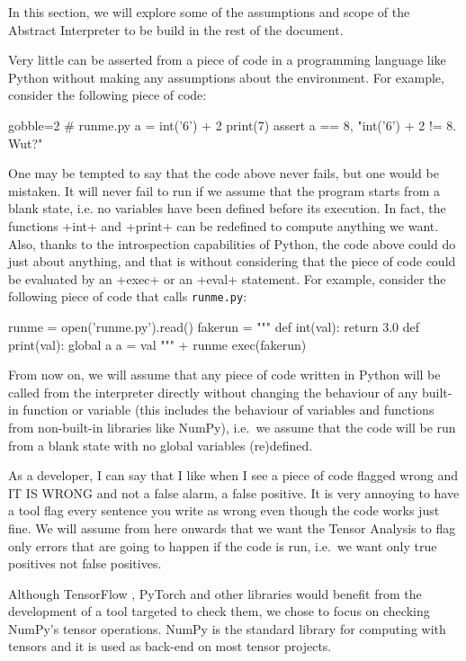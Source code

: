 In this section, we will explore some of the assumptions and scope of the Abstract
Interpreter to be build in the rest of the document.

Very little can be asserted from a piece of code in a programming language like Python
without making any assumptions about the environment. For example, consider the following
piece of code:

\begin{pythoncode*}{gobble=2}
  # runme.py
  a = int('6') + 2
  print(7)
  assert a == 8, "int('6') + 2 != 8. Wut?"
\end{pythoncode*}

One may be tempted to say that the code above never fails, but one would be mistaken.  It
will never fail to run if we assume that the program starts from a blank state, i.e. no
variables have been defined before its execution. In fact, the functions \pycode+int+ and
\pycode+print+ can be redefined to compute anything we want. Also, thanks to the
introspection capabilities of Python, the code above could do just about anything, and
that is without considering that the piece of code could be evaluated by an \pycode+exec+
or an \pycode+eval+ statement. For example, consider the following piece of code that
calls \texttt{runme.py}:

\begin{pythoncode}
  runme = open('runme.py').read()
  fakerun = """
  def int(val):
    return 3.0
  def print(val):
    global a
    a = val
  """ + runme
  exec(fakerun)
\end{pythoncode}

From now on, we will assume that any piece of code written in Python will be called from
the interpreter directly without changing the behaviour of any built-in function or
variable (this includes the behaviour of variables and functions from non-built-in
libraries like NumPy), i.e.~we assume that the code will be run from a blank state with no
global variables (re)defined.

As a developer, I can say that I like when I see a piece of code flagged wrong and IT IS
WRONG and not a false alarm, a false positive. It is very annoying to have a tool flag
every sentence you write as wrong even though the code works just fine. We will assume
from here onwards that we want the Tensor Analysis to flag only errors that are going to
happen if the code is run, i.e.~we want only true positives not false positives.

Although TensorFlow \autocite{abadi_tensorflow_2016}, PyTorch
\autocite{paszke2017pytorch} and other libraries would benefit from the development of a
tool targeted to check them, we chose to focus on checking NumPy's tensor operations.
NumPy is the standard library for computing with tensors and it is used as back-end on
most tensor projects.

